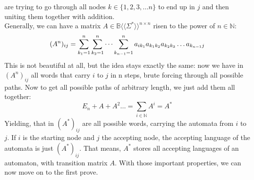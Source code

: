 \documentclass[12pt,letterpaper]{article}
\newcommand{\fps}[1] {
\mathbb{#1}\langle \langle \Sigma^* \rangle \rangle
}
\begin{document}
are trying to go through all nodes $k \in \{1, 2, 3, \dots n\}$
to end up in $j$ and then uniting them together with addition.\\
Generally, we can have a matrix $A \in \fps{B}^{n \times n}$
risen to the power of $n \in \mathbb{N}$:
\[
  (A^n)_{ij} = \sum_{k_1=1}^{n}
    \sum_{k_2=1}^{n}\dots \sum_{k_{n-1}=1}^n 
    a_{ik_1}a_{k_1k_2}a_{k_2k_3}\dots a_{k_{n-1}j} \\
\]
This is not beautiful at all, but the idea stays exactly the same: now we have in $(A^n)_{ij}$ all words that carry $i$ to $j$ in n steps, brute forcing through all possible paths. Now to get all possible paths of arbitrary length, we just add them all together:
\[
  E_n + A + A^2 \dots = \sum_{i \in \mathbb{N}} A^i = A^*
\]
Yielding, that in $(A^*)_{ij}$ are all possible words, carrying the automata from $i$ to $j$. If $i$ is the starting node and $j$ the accepting node, the accepting language of the automata is just
$(A^*)_{ij}$. That means, $A^*$ stores all accepting languages of  an automaton, with transition matrix $A$.
With those important properties, we can now move on to the first prove.
\\ 
\pagebreak
\\
\end{document}
